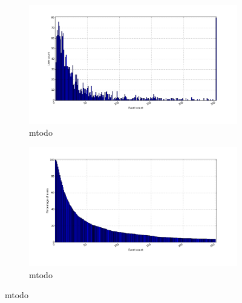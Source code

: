    \begin{figure}[H]
        \centering
        \begin{subfigure}{.5\textwidth}
            \centering
            \includegraphics[width=\dualGraphWidth]{image/user_iddistribution.png}
            \caption{mtodo}
    \label{figure:userEventDist}
        \end{subfigure}%
        \begin{subfigure}{.5\textwidth}
            \centering
            \includegraphics[width=\dualGraphWidth]{image/user_idcumdistribution.png}
            \caption{mtodo}
    \label{figure:userEventCumDist}
        \end{subfigure}
    \end{figure}

